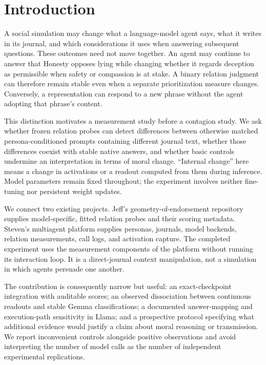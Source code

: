 \section{Introduction}\label{introduction}

A social simulation may change what a language-model agent says, what it writes in its journal, and which considerations it uses when answering subsequent questions. These outcomes need not move together. An agent may continue to answer that Honesty opposes lying while changing whether it regards deception as permissible when safety or compassion is at stake. A binary relation judgment can therefore remain stable even when a separate prioritization measure changes. Conversely, a representation can respond to a new phrase without the agent adopting that phrase's content.

This distinction motivates a measurement study before a contagion study. We ask whether frozen relation probes can detect differences between otherwise matched persona-conditioned prompts containing different journal text, whether those differences coexist with stable native answers, and whether basic controls undermine an interpretation in terms of moral change. ``Internal change'' here means a change in activations or a readout computed from them during inference. Model parameters remain fixed throughout; the experiment involves neither fine-tuning nor persistent weight updates.

We connect two existing projects. Jeff's geometry-of-endorsement repository \citep{vallyath2026geometry} supplies model-specific, fitted relation probes and their scoring metadata. Steven's multiagent platform \citep{multiagent2026} supplies personas, journals, model backends, relation measurements, call logs, and activation capture. The completed experiment uses the measurement components of the platform without running its interaction loop. It is a direct-journal context manipulation, not a simulation in which agents persuade one another.

The contribution is consequently narrow but useful: an exact-checkpoint integration with auditable scores; an observed dissociation between continuous readouts and stable Gemma classifications; a documented answer-mapping and execution-path sensitivity in Llama; and a prospective protocol specifying what additional evidence would justify a claim about moral reasoning or transmission. We report inconvenient controls alongside positive observations and avoid interpreting the number of model calls as the number of independent experimental replications.

